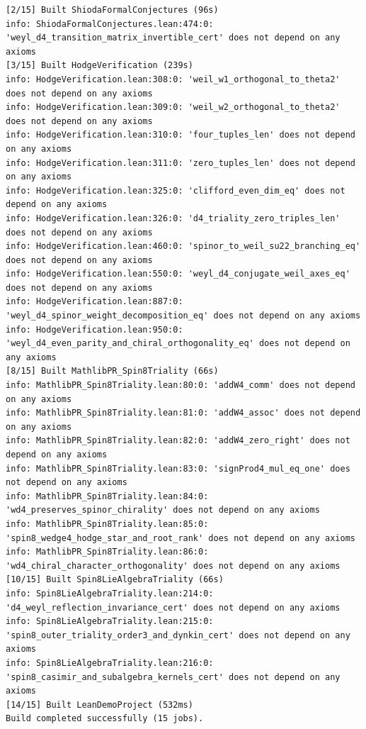 \documentclass[11pt,a4paper]{article}
\begin{document}
\begin{lstlisting}[language={},basicstyle=\ttfamily\scriptsize,caption={Raw \texttt{lake clean \&\& lake build} and \texttt{\#print axioms} output for Paper~3 theorems.}]
[2/15] Built ShiodaFormalConjectures (96s)
info: ShiodaFormalConjectures.lean:474:0: 'weyl_d4_transition_matrix_invertible_cert' does not depend on any axioms
[3/15] Built HodgeVerification (239s)
info: HodgeVerification.lean:308:0: 'weil_w1_orthogonal_to_theta2' does not depend on any axioms
info: HodgeVerification.lean:309:0: 'weil_w2_orthogonal_to_theta2' does not depend on any axioms
info: HodgeVerification.lean:310:0: 'four_tuples_len' does not depend on any axioms
info: HodgeVerification.lean:311:0: 'zero_tuples_len' does not depend on any axioms
info: HodgeVerification.lean:325:0: 'clifford_even_dim_eq' does not depend on any axioms
info: HodgeVerification.lean:326:0: 'd4_triality_zero_triples_len' does not depend on any axioms
info: HodgeVerification.lean:460:0: 'spinor_to_weil_su22_branching_eq' does not depend on any axioms
info: HodgeVerification.lean:550:0: 'weyl_d4_conjugate_weil_axes_eq' does not depend on any axioms
info: HodgeVerification.lean:887:0: 'weyl_d4_spinor_weight_decomposition_eq' does not depend on any axioms
info: HodgeVerification.lean:950:0: 'weyl_d4_even_parity_and_chiral_orthogonality_eq' does not depend on any axioms
[8/15] Built MathlibPR_Spin8Triality (66s)
info: MathlibPR_Spin8Triality.lean:80:0: 'addW4_comm' does not depend on any axioms
info: MathlibPR_Spin8Triality.lean:81:0: 'addW4_assoc' does not depend on any axioms
info: MathlibPR_Spin8Triality.lean:82:0: 'addW4_zero_right' does not depend on any axioms
info: MathlibPR_Spin8Triality.lean:83:0: 'signProd4_mul_eq_one' does not depend on any axioms
info: MathlibPR_Spin8Triality.lean:84:0: 'wd4_preserves_spinor_chirality' does not depend on any axioms
info: MathlibPR_Spin8Triality.lean:85:0: 'spin8_wedge4_hodge_star_and_root_rank' does not depend on any axioms
info: MathlibPR_Spin8Triality.lean:86:0: 'wd4_chiral_character_orthogonality' does not depend on any axioms
[10/15] Built Spin8LieAlgebraTriality (66s)
info: Spin8LieAlgebraTriality.lean:214:0: 'd4_weyl_reflection_invariance_cert' does not depend on any axioms
info: Spin8LieAlgebraTriality.lean:215:0: 'spin8_outer_triality_order3_and_dynkin_cert' does not depend on any axioms
info: Spin8LieAlgebraTriality.lean:216:0: 'spin8_casimir_and_subalgebra_kernels_cert' does not depend on any axioms
[14/15] Built LeanDemoProject (532ms)
Build completed successfully (15 jobs).
\end{lstlisting}
\end{document}
